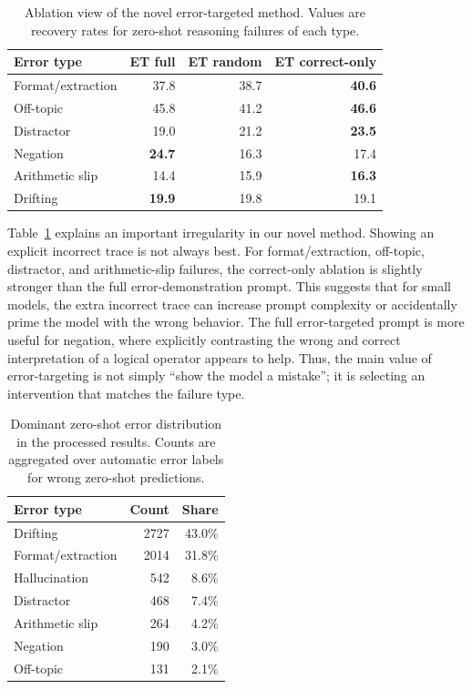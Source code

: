 \documentclass[10pt,twocolumn]{article}
\begin{document}
\begin{table}[t]
\centering
\caption{Ablation view of the novel error-targeted method. Values are recovery rates for zero-shot reasoning failures of each type.}
\label{tab:et-ablation}
\begin{tabular}{lrrr}
\toprule
Error type & ET full & ET random & ET correct-only\\
\midrule
Format/extraction & 37.8 & 38.7 & \textbf{40.6}\\
Off-topic & 45.8 & 41.2 & \textbf{46.6}\\
Distractor & 19.0 & 21.2 & \textbf{23.5}\\
Negation & \textbf{24.7} & 16.3 & 17.4\\
Arithmetic slip & 14.4 & 15.9 & \textbf{16.3}\\
Drifting & \textbf{19.9} & 19.8 & 19.1\\
\bottomrule
\end{tabular}
\end{table}

Table~\ref{tab:et-ablation} explains an important irregularity in our novel method. Showing an explicit incorrect trace is not always best. For format/extraction, off-topic, distractor, and arithmetic-slip failures, the correct-only ablation is slightly stronger than the full error-demonstration prompt. This suggests that for small models, the extra incorrect trace can increase prompt complexity or accidentally prime the model with the wrong behavior. The full error-targeted prompt is more useful for negation, where explicitly contrasting the wrong and correct interpretation of a logical operator appears to help. Thus, the main value of error-targeting is not simply ``show the model a mistake''; it is selecting an intervention that matches the failure type.

\begin{table}[t]
\centering
\caption{Dominant zero-shot error distribution in the processed results. Counts are aggregated over automatic error labels for wrong zero-shot predictions.}
\label{tab:error-dist}
\begin{tabular}{lrr}
\toprule
Error type & Count & Share\\
\midrule
Drifting & 2727 & 43.0\%\\
Format/extraction & 2014 & 31.8\%\\
Hallucination & 542 & 8.6\%\\
Distractor & 468 & 7.4\%\\
Arithmetic slip & 264 & 4.2\%\\
Negation & 190 & 3.0\%\\
Off-topic & 131 & 2.1\%\\
\bottomrule
\end{tabular}
\end{table}
\end{document}
